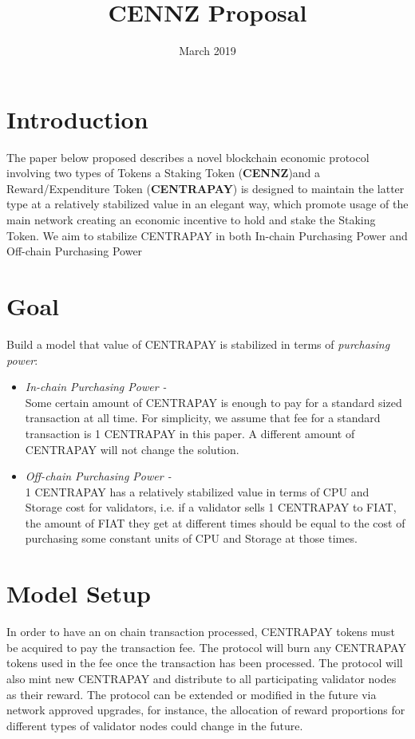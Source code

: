 \documentclass{article}
\title{CENNZ Proposal}
\author{}
\date{March 2019}
\begin{document}
\maketitle

\section{Introduction} The paper below proposed describes a novel blockchain economic protocol involving two types of Tokens a Staking Token (\textbf{CENNZ})and a Reward/Expenditure Token (\textbf{CENTRAPAY}) is designed to maintain the latter type at a relatively stabilized value in an elegant way, which promote usage of the main network creating an economic incentive to hold and stake the Staking Token. We aim to stabilize CENTRAPAY in both In-chain Purchasing Power and Off-chain Purchasing Power

\section{Goal}
Build a model that value of CENTRAPAY is stabilized in terms of \textit{purchasing power}: 

\begin{itemize}
  \item \textit{In-chain Purchasing Power -} \\
  Some certain amount of CENTRAPAY is enough to pay for a standard sized transaction at all time. For simplicity, we assume that fee for a standard transaction is 1 CENTRAPAY in this paper. A different amount of CENTRAPAY will not change the solution.
  \item \textit{Off-chain Purchasing Power - }\\
  1 CENTRAPAY has a relatively stabilized value in terms of CPU and Storage cost for validators, i.e. if a validator sells 1 CENTRAPAY to FIAT, the amount of FIAT they get at different times should be equal to the cost of purchasing some constant units of CPU and Storage at those times. 
\end{itemize}


\section{Model Setup}
In order to have an on chain transaction processed, CENTRAPAY tokens must be acquired to pay the transaction fee. The protocol will burn any CENTRAPAY tokens used in the fee  once the transaction has been processed. The protocol will also mint new CENTRAPAY and distribute to all participating validator nodes as their reward. The protocol can be extended or modified in the future via network approved upgrades, for instance, the allocation of reward proportions for different types of validator nodes could change in the future. 
\end{document}
